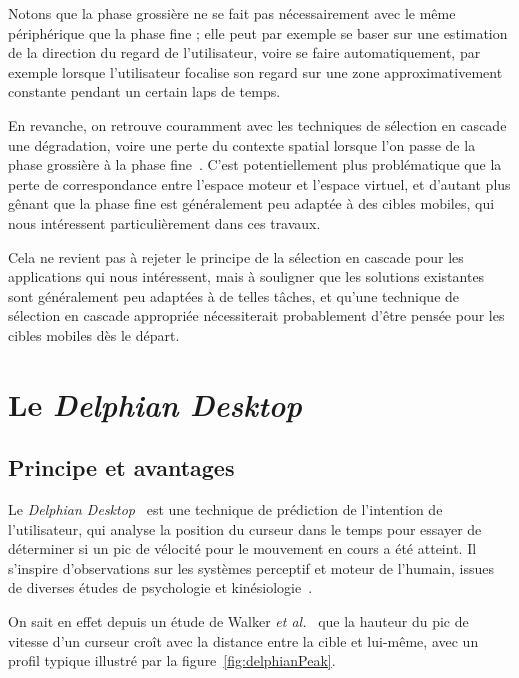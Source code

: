 	Notons que la phase grossière ne se fait pas nécessairement avec le même périphérique que la phase fine ; elle peut par exemple se baser sur une estimation de la direction du regard de l'utilisateur, voire se faire automatiquement, par exemple lorsque l'utilisateur focalise son regard sur une zone approximativement constante pendant un certain laps de temps.
	
	En revanche, on retrouve couramment avec les techniques de sélection en cascade une dégradation, voire une perte du contexte spatial lorsque l'on passe de la phase grossière à la phase fine~\cite{kopper2011rapid, debarba2013disambiguation}. C'est potentiellement plus problématique que la perte de correspondance entre l'espace moteur et l'espace virtuel, et d'autant plus gênant que la phase fine est généralement peu adaptée à des cibles mobiles, qui nous intéressent particulièrement dans ces travaux.
	
	Cela ne revient pas à rejeter le principe de la sélection en cascade pour les applications qui nous intéressent, mais à souligner que les solutions existantes sont généralement peu adaptées à de telles tâches, et qu'une technique de sélection en cascade appropriée nécessiterait probablement d'être pensée pour les cibles mobiles dès le départ.	

	
\section{Le \emph{Delphian Desktop}}
	\subsection{Principe et avantages}
	Le \emph{Delphian Desktop}~\cite{asano2005predictive} est une technique de prédiction de l'intention de l'utilisateur, qui analyse la position du curseur dans le temps pour essayer de déterminer si un pic de vélocité pour le mouvement en cours a été atteint. Il s'inspire d'observations sur les systèmes perceptif et moteur de l'humain, issues de diverses études de psychologie et kinésiologie~\cite{accot2003refining, graham1995pointing, graham1996physical, mackenzie1992extending, mackenzie1994prediction, takagi2002fundamental, walker1993spatial}.
	
	On sait en effet depuis un étude de Walker \emph{et al.}~\cite{walker1993spatial} que la hauteur du pic de vitesse d'un curseur croît avec la distance entre la cible et lui-même, avec un profil typique illustré par la figure~\ref{fig:delphianPeak}.

